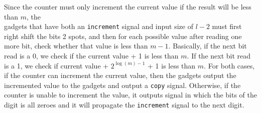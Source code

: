 Since the counter must only increment the current value if the result will be less than $m$,
the \\{\cread} gadgets that have both an {\tt increment} signal and input size of $l - 2$ must
first right shift the bits 2 spots, and then for each possible value after reading one more bit,
check whether that value is less than $m - 1$. %
%
Basically, if the next bit read is a 0, we check if the current value + 1 is less than $m$.
%
%
%
%
%
%
%
If the next bit read is a 1, we check if current value + $2^{\log (m) - 1}$ + 1 is less than $m$.
%
For both cases, if the counter can increment the current value, then
the {\cread} gadgets output the incremented value to the {\prewarp} gadgets and output a {\tt copy}
signal. Otherwise, if the counter is unable to increment the value, it outputs signal in which the bits
of the digit is all zeroes and it will propagate the {\tt increment} signal to the next digit.


